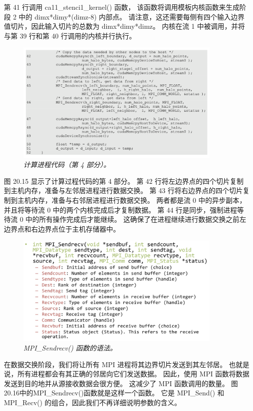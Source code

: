 第 41 行调用 ca11\_stenci1\_kernel() 函数，
该函数将调用模板内核函数来生成阶段 2 中的 dimx*dimy*(dimz-8) 内部点。 
请注意，这还需要每侧有四个输入边界值切片，因此输入切片的总数为 dimx*dimy*dimz。 
内核在流 1 中被调用，并将与第 39 行和第 40 行调用的内核并行执行。

\begin{figure}[H]
	\centering
	\includegraphics[width=0.9\textwidth]{figs/F20.15.png}
	\caption{\textit{计算进程代码（第 4 部分）。}}
\end{figure}

图 20.15 显示了计算过程代码的第 4 部分。 第 42 行将左边界点的四个切片复制到主机内存，准备与左邻居进程进行数据交换。 
第 43 行将右边界点的四个切片复制到主机内存，准备与右邻居进程进行数据交换。 
两者都是流 0 中的异步副本，并且将等待流 0 中的两个内核完成后才复制数据。 
第 44 行是同步，强制进程等待流 0 中的所有操作完成后才能继续。 
这确保了在进程继续进行数据交换之前左边界点和右边界点位于主机存储器中。

\begin{figure}[H]
	\centering
	\includegraphics[width=0.9\textwidth]{figs/F20.16.png}
	\caption{\textit{MPI\_Sendrecv() 函数的语法。}}
\end{figure}

在数据交换阶段，我们将让所有 MPI 进程将其边界切片发送到其左邻居。 也就是说，所有进程都会有其正确的邻居向它们发送数据。 
因此，使用 MPI 函数将数据发送到目的地并从源接收数据会很方便。 这减少了 MPI 函数调用的数量。 
图20.16中的MPI\_Sendrecv()函数就是这样一个函数。 
它是 MPI\_Send() 和 MPI\_Recv() 的组合，因此我们不再详细说明参数的含义。

